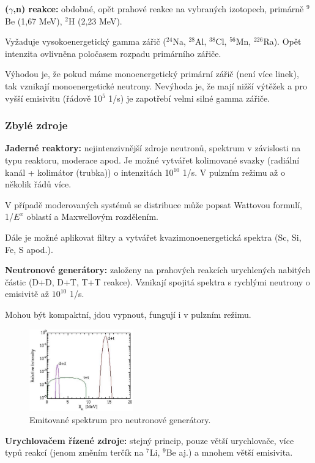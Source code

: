 \textbf{($\gamma$,n) reakce:} obdobné, opět prahové reakce na vybraných izotopech, primárně $^9$Be (1,67 MeV), $^2$H (2,23 MeV).

Vyžaduje vysokoenergetický gamma zářič ($^{24}$Na, $^{28}$Al, $^{38}$Cl, $^{56}$Mn, $^{226}$Ra). Opět intenzita ovlivněna poločasem rozpadu primárního zářiče.

Výhodou je, že pokud máme monoenergetický primární zářič (není více linek), tak vznikají monoenergetické neutrony. Nevýhoda je, že mají nižší výtěžek a pro vyšší emisivitu (řádově 10$^5$ 1/s) je zapotřebí velmi silné gamma zářiče.

\subsubsection{Zbylé zdroje}

\textbf{Jaderné reaktory:} nejintenzivnější zdroje neutronů, spektrum v závislosti na typu reaktoru, moderace apod. Je možné vytvářet kolimované svazky (radiální kanál + kolimátor (trubka)) o intenzitách 10$^{10}$ 1/s. V pulzním režimu až o několik řádů více.

V případě moderovaných systémů se distribuce může popsat Wattovou formulí, 1/$E^x$ oblastí a Maxwellovým rozdělením.

Dále je možné aplikovat filtry a vytvářet kvazimonoenergetická spektra (Sc, Si, Fe, S apod.).

\textbf{Neutronové generátory:} založeny na prahových reakcích urychlených nabitých částic (D+D, D+T, T+T reakce). Vznikají spojitá spektra s rychlými neutrony o emisivitě až $10^{10}$ 1/s.

Mohou být kompaktní, jdou vypnout, fungují i v pulzním režimu.

\begin{figure}[H]
    \centering
    \includegraphics[width=0.4\textwidth]{img/generatory_E.JPG}
    \caption{Emitované spektrum pro neutronové generátory.}
\end{figure}

\textbf{Urychlovačem řízené zdroje:} stejný princip, pouze větší urychlovače, více typů reakcí (jenom změním terčík na $^7$Li, $^9$Be aj.) a mnohem větší emisivita.

